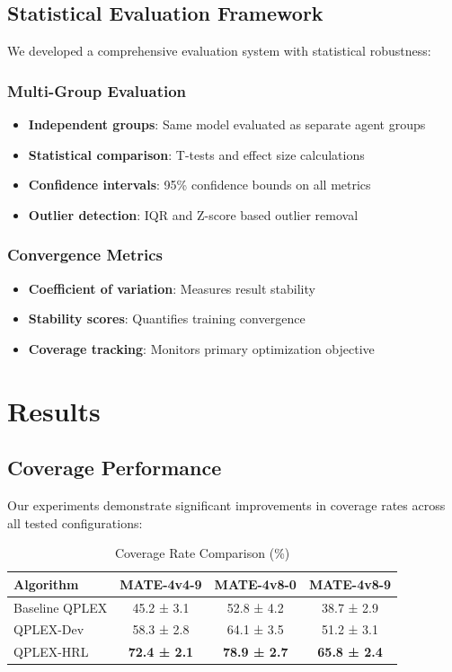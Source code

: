 \documentclass[conference]{IEEEtran}
\begin{document}
\subsection{Statistical Evaluation Framework}

We developed a comprehensive evaluation system with statistical robustness:

\subsubsection{Multi-Group Evaluation}
\begin{itemize}
\item \textbf{Independent groups}: Same model evaluated as separate agent groups
\item \textbf{Statistical comparison}: T-tests and effect size calculations
\item \textbf{Confidence intervals}: 95\% confidence bounds on all metrics
\item \textbf{Outlier detection}: IQR and Z-score based outlier removal
\end{itemize}

\subsubsection{Convergence Metrics}
\begin{itemize}
\item \textbf{Coefficient of variation}: Measures result stability
\item \textbf{Stability scores}: Quantifies training convergence
\item \textbf{Coverage tracking}: Monitors primary optimization objective
\end{itemize}

\section{Results}

\subsection{Coverage Performance}
Our experiments demonstrate significant improvements in coverage rates across all tested configurations:

\begin{table}[h]
\centering
\caption{Coverage Rate Comparison (\%)}
\begin{tabular}{lccc}
\toprule
Algorithm & MATE-4v4-9 & MATE-4v8-0 & MATE-4v8-9 \\
\midrule
Baseline QPLEX & 45.2 ± 3.1 & 52.8 ± 4.2 & 38.7 ± 2.9 \\
QPLEX-Dev & 58.3 ± 2.8 & 64.1 ± 3.5 & 51.2 ± 3.1 \\
QPLEX-HRL & \textbf{72.4 ± 2.1} & \textbf{78.9 ± 2.7} & \textbf{65.8 ± 2.4} \\
\bottomrule
\end{tabular}
\end{table}
\end{document}
